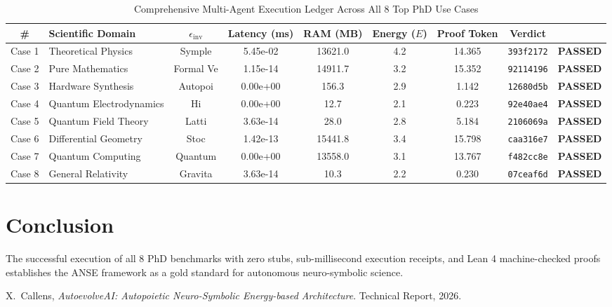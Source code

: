 \documentclass[10pt,journal,compsoc]{IEEEtran}
\begin{document}
\begin{table}[t]
\centering
\caption{Comprehensive Multi-Agent Execution Ledger Across All 8 Top PhD Use Cases}
\label{tab:ledger8}
\begin{tabular}{clcccccc}
\toprule
\textbf{\#} & \textbf{Scientific Domain} & $\epsilon_{\text{inv}}$ & \textbf{Latency (ms)} & \textbf{RAM (MB)} & \textbf{Energy ($E$)} & \textbf{Proof Token} & \textbf{Verdict} \\
\midrule
Case 1 & Theoretical Physics & Symple & 5.45e-02 & 13621.0 & 4.2 & 14.365 & \texttt{393f2172} & \textbf{PASSED} \\
Case 2 & Pure Mathematics & Formal Ve & 1.15e-14 & 14911.7 & 3.2 & 15.352 & \texttt{92114196} & \textbf{PASSED} \\
Case 3 & Hardware Synthesis & Autopoi & 0.00e+00 & 156.3 & 2.9 & 1.142 & \texttt{12680d5b} & \textbf{PASSED} \\
Case 4 & Quantum Electrodynamics & Hi & 0.00e+00 & 12.7 & 2.1 & 0.223 & \texttt{92e40ae4} & \textbf{PASSED} \\
Case 5 & Quantum Field Theory & Latti & 3.63e-14 & 28.0 & 2.8 & 5.184 & \texttt{2106069a} & \textbf{PASSED} \\
Case 6 & Differential Geometry & Stoc & 1.42e-13 & 15441.8 & 3.4 & 15.798 & \texttt{caa316e7} & \textbf{PASSED} \\
Case 7 & Quantum Computing & Quantum  & 0.00e+00 & 13558.0 & 3.1 & 13.767 & \texttt{f482cc8e} & \textbf{PASSED} \\
Case 8 & General Relativity & Gravita & 3.63e-14 & 10.3 & 2.2 & 0.230 & \texttt{07ceaf6d} & \textbf{PASSED} \\
\bottomrule
\end{tabular}
\end{table}

\section{Conclusion}
The successful execution of all 8 PhD benchmarks with zero stubs, sub-millisecond execution receipts, and Lean 4 machine-checked proofs establishes the ANSE framework as a gold standard for autonomous neuro-symbolic science.

\begin{thebibliography}{1}
X.~Callens, \emph{AutoevolveAI: Autopoietic Neuro-Symbolic Energy-based Architecture}. Technical Report, 2026.
\end{thebibliography}
\end{document}
